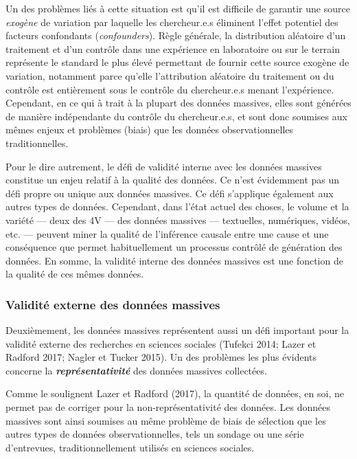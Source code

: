 \documentclass[
  letterpaper,
]{scrbook}
\begin{document}
Un des problèmes liés à cette situation est qu'il est difficile de
garantir une source \emph{exogène} de variation par laquelle les
chercheur.e.s éliminent l'effet potentiel des facteurs confondants
(\emph{confounders}). Règle générale, la distribution aléatoire d'un
traitement et d'un contrôle dans une expérience en laboratoire ou sur le
terrain représente le standard le plus élevé permettant de fournir cette
source exogène de variation, notamment parce qu'elle l'attribution
aléatoire du traitement ou du contrôle est entièrement sous le contrôle
du chercheur.e.s menant l'expérience. Cependant, en ce qui à trait à la
plupart des données massives, elles sont générées de manière
indépendante du contrôle du chercheur.e.s, et sont donc soumises aux
mêmes enjeux et problèmes (biais) que les données observationnelles
traditionnelles.

Pour le dire autrement, le défi de validité interne avec les données
massives constitue un enjeu relatif à la qualité des données. Ce n'est
évidemment pas un défi propre ou unique aux données massives. Ce défi
s'applique également aux autres types de données. Cependant, dans l'état
actuel des choses, le volume et la variété --- deux des 4V --- des
données massives --- textuelles, numériques, vidéos, etc. --- peuvent
miner la qualité de l'inférence causale entre une cause et une
conséquence que permet habituellement un processus contrôlé de
génération des données. En somme, la validité interne des données
massives est une fonction de la qualité de ces mêmes données.

\hypertarget{validituxe9-externe-des-donnuxe9es-massives}{%
\subsubsection{Validité externe des données
massives}\label{validituxe9-externe-des-donnuxe9es-massives}}

Deuxièmement, les données massives représentent aussi un défi important
pour la validité externe des recherches en sciences sociales (Tufekci
2014; Lazer et Radford 2017; Nagler et Tucker 2015). Un des problèmes
les plus évidents concerne la \textbf{\emph{représentativité}} des
données massives collectées.

Comme le soulignent Lazer et Radford (2017), la quantité de données, en
soi, ne permet pas de corriger pour la non-représentativité des données.
Les données massives sont ainsi soumises au même problème de biais de
sélection que les autres types de données observationnelles, tels un
sondage ou une série d'entrevues, traditionnellement utilisés en
sciences sociales.
\end{document}
